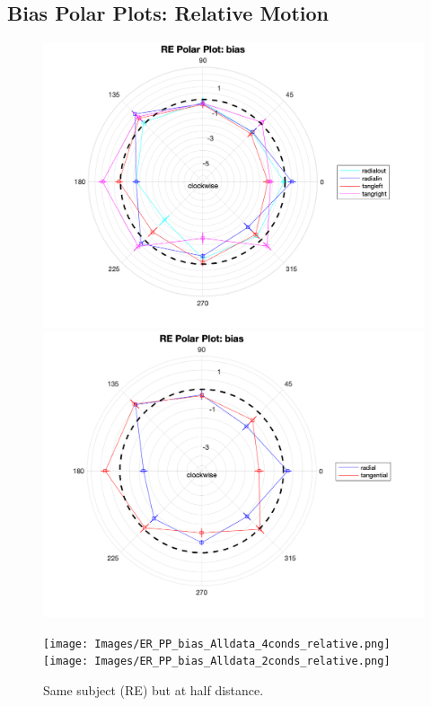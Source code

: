 \documentclass[11pt]{article} %
\begin{document}
\newpage
\subsection{Bias Polar Plots: Relative Motion}
\begin{figure}[H]
\centering %
\includegraphics[scale=.3]{Images/RE_PP_bias_Alldata_4conds.png}
\includegraphics[scale=.3]{Images/RE_PP_bias_Alldata_2conds.png}
\end{figure}
\begin{figure}[H]
\centering %
\texttt{[image: Images/ER\_PP\_bias\_Alldata\_4conds\_relative.png]}
\texttt{[image: Images/ER\_PP\_bias\_Alldata\_2conds\_relative.png]}
\caption{Same subject (RE) but at half distance.}
\end{figure}
\end{document}
